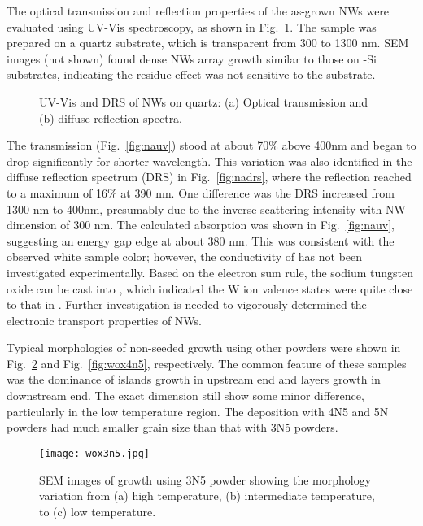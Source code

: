 The optical transmission and reflection properties of the as-grown  NWs were evaluated using UV-Vis spectroscopy, as shown in Fig.~\ref{fig:ch3naxuvvis}. The sample was prepared on a quartz substrate, which is transparent from 300 to 1300 nm. SEM images (not shown) found dense NWs array growth similar to those on -Si substrates, indicating the residue effect was not sensitive to the substrate. 
\begin{figure}[htb]
\centering
{}\hspace{0.04\textwidth}
\caption[UV-Vis and \gls{drs} of  NWs on quartz]{UV-Vis and DRS of  NWs on quartz: (a) Optical transmission and (b) diffuse reflection spectra.}
\label{fig:ch3naxuvvis}
\end{figure}
The transmission (Fig.~\ref{fig:nauv}) stood at about 70\% above 400nm and began to drop significantly for shorter wavelength. This variation was also identified in the diffuse reflection spectrum (DRS) in Fig.~\ref{fig:nadrs}, where the reflection reached to a maximum of 16\% at 390 nm. One difference was the DRS increased from 1300 nm to 400nm, presumably due to the inverse scattering intensity with NW dimension of 300 nm. The calculated absorption was shown in Fig.~\ref{fig:nauv}, suggesting an energy gap edge at about 380 nm. This was consistent with the observed white sample color; however, the conductivity of  has not been investigated experimentally. Based on the electron sum rule, the sodium tungsten oxide can be cast into , which indicated the W ion valence states were quite close to that in . Further investigation is needed to vigorously determined the electronic transport properties of  NWs. 

Typical morphologies of non-seeded growth using other powders were shown in Fig.~\ref{fig:wox3n5} and Fig.~\ref{fig:wox4n5}, respectively. The common feature of these samples was the dominance of islands growth in upstream end and layers growth in downstream end. The exact dimension still show some minor difference, particularly in the low temperature region. The deposition with 4N5 and 5N powders had much smaller grain size than that with 3N5 powders.
\begin{figure}[htb]
\centering
\texttt{[image: wox3n5.jpg]}
\caption[SEM images of  growth using 3N5 powder]{SEM images of  growth using 3N5 powder showing the morphology variation from (a) high temperature, (b) intermediate temperature, to (c) low temperature.}
\label{fig:wox3n5}
\end{figure}

